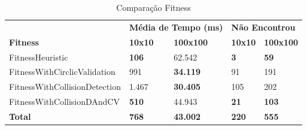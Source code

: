 \begin{table}[]
	\centering
	\caption{Comparação Fitness}
	\label{my-label}
	\begin{tabular}{lllll}
		\textbf{}                                         & \multicolumn{2}{l}{\textbf{Média de Tempo (ms)}}             & \multicolumn{2}{l}{\textbf{Não Encontrou}}               \\
		\textbf{Fitness}                                  & \textbf{10x10}              & \textbf{100x100}               & \textbf{10x10}             & \textbf{100x100}            \\
		FitnessHeuristic                                  & \textbf{106} & 62.542                         & \textbf{3}  & \textbf{59}  \\
		FitnessWithCirclicValidation                      & 991                         & \textbf{34.119} & 91                         & 191                         \\
		FitnessWithCollisionDetection                     & 1.467                       & \textbf{30.405} & 105                        & 202                         \\
		FitnessWithCollisionDAndCV & \textbf{510} & 44.943                         & \textbf{21} & \textbf{103} \\
		\textbf{Total}                                    & \textbf{768}                & \textbf{43.002}                & \textbf{220}               & \textbf{555}               
	\end{tabular}
\end{table}

